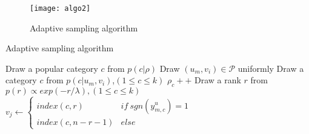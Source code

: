\begin{frame}
	\begin{figure}
			\texttt{[image: algo2]}
	\caption{Adaptive sampling algorithm}
	\end{figure}
\end{frame}


\begin{frame}{Adaptive sampling algorithm}
	\IncMargin{1em}
	\begin{algorithm}[H]%
		\SetAlgoNoLine %
		Draw a popular category $c$ from $p\left(c|\rho\right)$\;
		Draw $\left(u_m,v_i\right) \in \mathcal{P}$ uniformly\;
		Draw a category $c$ from $p\left(c|u_m,v_i\right)$,$\left(1\leq c \leq k\right)$\;
		$\rho_c ++$\;
		Draw a rank $r$ from $p\left(r\right) \propto exp\left(-r/\lambda\right),\left(1\leq c \leq k\right)$\;
		$v_j \leftarrow 
		\begin{cases}
		index\left(c,r\right) & if \ sgn\left(y_{m,c}^u\right) = 1\\
		index\left(c,n-r-1\right) & else
		\end{cases}$\;
		\caption{Content-aware and Adaptive sampling}
		\label{algo:sampling}
	\end{algorithm}
	\DecMargin{1em}
\end{frame}



